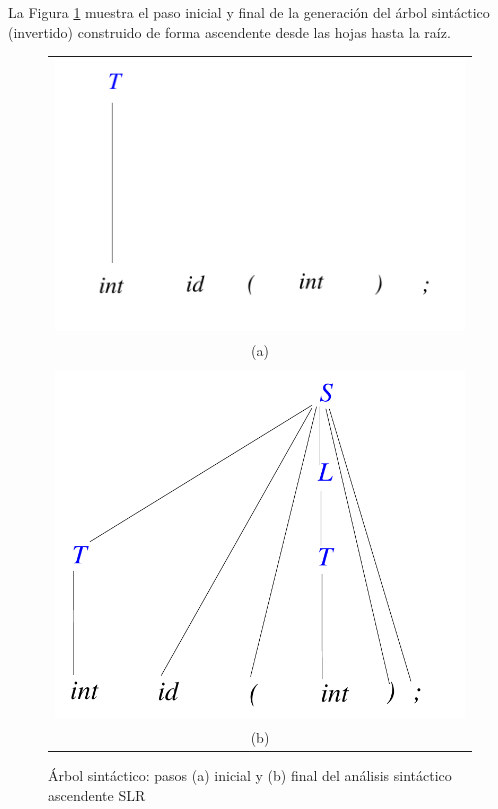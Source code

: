 La Figura \ref{fig:pasos-analisis-ascendente-SLR} muestra el paso inicial y final de la generación del árbol sintáctico (invertido) construido de forma ascendente desde las hojas hasta la raíz.

\begin{figure}[htp]
    \centering
    \begin{tabular}{c}
        \includegraphics[scale=0.5]{figuras/Cap3/SLR-paso-inicial.pdf} \\ 
        (a) \\ 
        \\
        \includegraphics[scale=0.5]{figuras/Cap3/SLR-paso-final.pdf}  \\
        (b)
    \end{tabular}
    \caption{Árbol sintáctico: pasos (a) inicial y (b) final del análisis sintáctico ascendente SLR}\label{fig:pasos-analisis-ascendente-SLR}
\end{figure}

